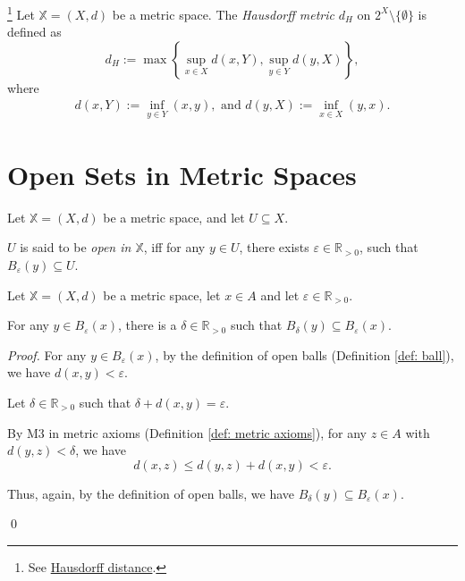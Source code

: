 \begin{example}
	\footnote{
		See \href{https://en.wikipedia.org/wiki/Hausdorff_distance}{Hausdorff distance}.
	}	
	Let $\mathbb X = (X, d)$ be a metric space. The \textit{Hausdorff metric} $d_H$ on $2^X \setminus \{\emptyset\}$ is defined as
	$$
	d_H := \max \left\{ \sup_{x \in X}d(x,Y), \sup_{y \in Y} d(y, X)\right\},
	$$
	where
	$$
	\begin{aligned}
		d(x,Y) := \inf_{y \in Y}(x,y), \text{ and } d(y, X) := \inf_{x \in X} (y, x).
	\end{aligned}
	$$
\end{example}


\section{Open Sets in Metric Spaces}


\begin{definition}
	\label{def: open set in metric space}
	Let $\mathbb X = (X, d)$ be a metric space, and let $U \subseteq X$.
	
	$U$ is said to be \textit{open in $\mathbb X$}, iff for any $y \in U$, there exists $\varepsilon \in \mathbb R_{> 0}$, such that $B_\varepsilon(y) \subseteq U$.
\end{definition}


\begin{proposition}
	\label{prop: open balls of point inside open ball}
	Let $\mathbb X = (X, d)$ be a metric space, let $x \in A$ and let $\varepsilon \in \mathbb R_{> 0}$.
	
	For any $y \in B_\varepsilon (x)$, there is a $\delta \in \mathbb R_{> 0}$ such that $B_\delta (y) \subseteq B_\varepsilon(x)$.
	
	\begin{proof}
		For any $y \in B_\varepsilon (x)$, by the definition of open balls (Definition \ref{def: ball}), we have $d(x,y) < \varepsilon$.
		
		Let $\delta \in \mathbb R_{> 0}$ such that $\delta + d(x,y) = \varepsilon$.
		
		By M3 in metric axioms (Definition \ref{def: metric axioms}), for any $z \in A$ with $d(y,z) < \delta$, we have
		$$
		d(x, z) \le d(y, z) + d(x, y) < \varepsilon.
		$$
		
		Thus, again, by the definition of open balls, we have $B_\delta(y) \subseteq B_\varepsilon(x)$.
		
		\qed
	\end{proof}
\end{proposition}


